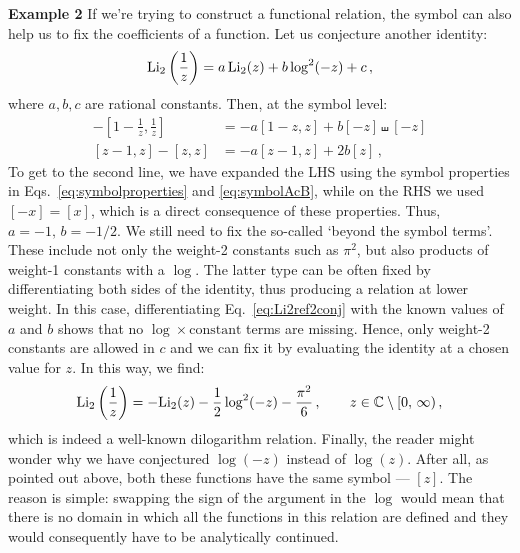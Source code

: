 \documentclass[main.tex]{subfiles}
\begin{document}
\textbf{Example 2} \newline
If we're trying to construct a functional relation, the symbol can also help us to fix the coefficients of a function. Let us conjecture another identity:
\begin{equation} \label{eq:Li2ref2conj}
    \text{Li}_2\left( \frac{1}{z} \right) = a\,\text{Li}_2(z) + b \log^2(-z) + c\,,
\end{equation}
where $a,b,c$ are rational constants. Then, at the symbol level:
\begin{align}
    -\left[1-\frac{1}{z}, \frac{1}{z}\right] &= -a[1-z, z] + b[-z] \shuffle [-z] \nonumber \\
    [z-1,z] - [z,z] &= -a[z-1, z] + 2 b[z]\,,
\end{align}
To get to the second line, we have expanded the LHS using the symbol properties in Eqs.~\ref{eq:symbolproperties} and \ref{eq:symbolAcB}, while on the RHS we used $[-x]=[x]$, which is a direct consequence of these properties. Thus, $a=-1, \, b=-1/2$. We still need to fix the so-called `beyond the symbol terms'. These include not only the weight-2 constants such as $\pi^2$, but also products of weight-1 constants with a $\log$. The latter type can be often fixed by differentiating both sides of the identity, thus producing a relation at lower weight. In this case, differentiating Eq.~\ref{eq:Li2ref2conj} with the known values of $a$ and $b$ shows that no $\log \times \text{constant}$ terms are missing. Hence, only weight-2 constants are allowed in $c$ and we can fix it by evaluating the identity at a chosen value for $z$. In this way, we find:
\begin{equation} \label{eq:Li2ref2}
    \text{Li}_2\left( \frac{1}{z} \right) = -\text{Li}_2(z) - \frac{1}{2} \log^2(-z) - \frac{\pi^2}{6}\,, \qquad z \in \mathbb{C} \setminus [0,\, \infty)\,,
\end{equation}
which is indeed a well-known dilogarithm relation. Finally, the reader might wonder why we have conjectured $\log(-z)$ instead of $\log(z)$. After all, as pointed out above, both these functions have the same symbol --- $[z]$. The reason is simple: swapping the sign of the argument in the $\log$ would mean that there is no domain in which all the functions in this relation are defined and they would consequently have to be analytically continued.
\end{document}
